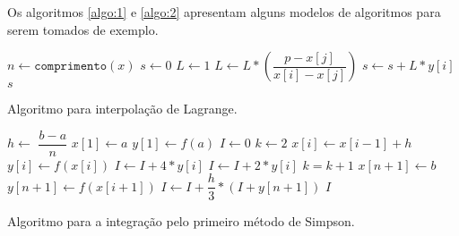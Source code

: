 Os algoritmos \ref{algo:1} e \ref{algo:2} apresentam alguns modelos de algoritmos para serem tomados de exemplo.

\begin{algorithm}
{}
$n \leftarrow \mathtt{comprimento}(x)$\;
$s \leftarrow 0$\;
 {
	$L \leftarrow 1$\;
	 {
		 {
			$L \leftarrow L* \left( \dfrac{p-x[j]}{x[i]-x[j]} \right) $
		}
	}
	$s \leftarrow s + L*y[i]$\;
}
\Retorna $s$\;
\caption{Algoritmo para interpolação de Lagrange.}
\label{algo:1}
\end{algorithm}

\begin{algorithm}
{}
$h \leftarrow$ $\dfrac{b-a}{n}$\;
$x[1] \leftarrow a$\;
$y[1] \leftarrow f(a)$\;
$I \leftarrow 0$\;
$k \leftarrow 2$\;
 {
	$x[i] \leftarrow x[i-1] + h$\;
	$y[i] \leftarrow f(x[i])$\;
	 {
		$I \leftarrow I + 4*y[i]$\;
	}
	{
		$I \leftarrow I + 2*y[i]$\;
	}
	$k = k+1$\;
}
$x[n+1] \leftarrow b$\;
$y[n+1] \leftarrow f(x[i+1])$\;
$I \leftarrow I + \dfrac{h}{3}*(I + y[n+1])$\;
\Retorna $I$\;
\caption{Algoritmo para a integração pelo primeiro método de Simpson.}
\label{algo:2}
\end{algorithm}
